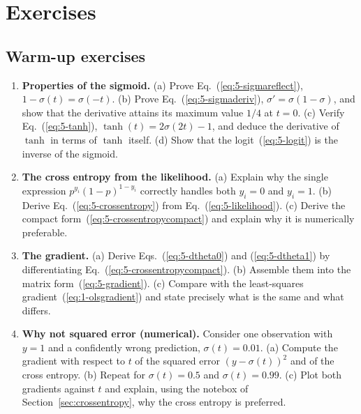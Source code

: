 \section{Exercises}
\label{sec:ch5exercises}

\subsection*{Warm-up exercises}

\begin{enumerate}

\item \textbf{Properties of the sigmoid.}
  (a) Prove Eq.~(\ref{eq:5-sigmareflect}), $1-\sigma(t)=\sigma(-t)$.
  (b) Prove Eq.~(\ref{eq:5-sigmaderiv}),
      $\sigma'=\sigma(1-\sigma)$, and show that the derivative attains its
      maximum value $1/4$ at $t=0$.
  (c) Verify Eq.~(\ref{eq:5-tanh}), $\tanh(t)=2\sigma(2t)-1$, and deduce the
      derivative of $\tanh$ in terms of $\tanh$ itself.
  (d) Show that the logit~(\ref{eq:5-logit}) is the inverse of the sigmoid.

\item \textbf{The cross entropy from the likelihood.}
  (a) Explain why the single expression $p^{y_i}(1-p)^{1-y_i}$ correctly
      handles both $y_i=0$ and $y_i=1$.
  (b) Derive Eq.~(\ref{eq:5-crossentropy}) from
      Eq.~(\ref{eq:5-likelihood}).
  (c) Derive the compact form~(\ref{eq:5-crossentropycompact}) and explain why
      it is numerically preferable.

\item \textbf{The gradient.}
  (a) Derive Eqs.~(\ref{eq:5-dtheta0}) and (\ref{eq:5-dtheta1}) by
      differentiating Eq.~(\ref{eq:5-crossentropycompact}).
  (b) Assemble them into the matrix form~(\ref{eq:5-gradient}).
  (c) Compare with the least-squares gradient~(\ref{eq:1-olsgradient}) and
      state precisely what is the same and what differs.

\item \textbf{Why not squared error (numerical).}
  Consider one observation with $y=1$ and a confidently wrong prediction,
  $\sigma(t)=0.01$.
  (a) Compute the gradient with respect to $t$ of the squared error
      $(y-\sigma(t))^{2}$ and of the cross entropy.
  (b) Repeat for $\sigma(t)=0.5$ and $\sigma(t)=0.99$.
  (c) Plot both gradients against $t$ and explain, using the notebox of
      Section~\ref{sec:crossentropy}, why the cross entropy is preferred.


\end{enumerate}
